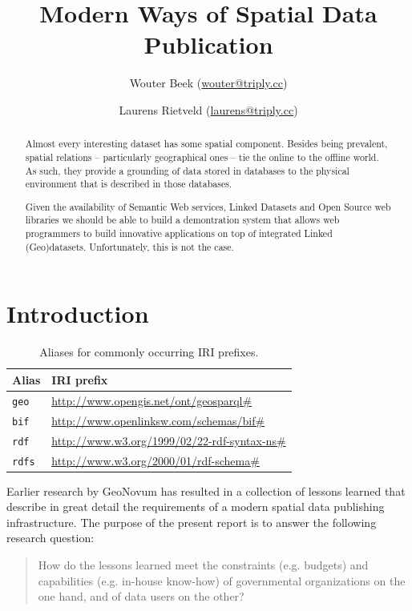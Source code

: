 \documentclass[a4paper]{scrartcl}
\title{Modern Ways of Spatial Data Publication}
\author{Wouter Beek ({\small\url{wouter@triply.cc}})}
\author{Laurens Rietveld ({\small\url{laurens@triply.cc}})}
\affil{Triply ({\small\url{http://triply.cc}})}
\date{}
\newcommand{\textt}[1]{{\small \texttt{#1}}}
\begin{document}
\maketitle

\begin{abstract}
  Almost every interesting dataset has some spatial component.
  Besides being prevalent, spatial relations -- particularly
  geographical ones -- tie the online to the offline world.  As such,
  they provide a grounding of data stored in databases to the physical
  environment that is described in those databases.

  Given the availability of Semantic Web services, Linked Datasets and
  Open Source web libraries we should be able to build a demontration
  system that allows web programmers to build innovative applications
  on top of integrated Linked (Geo)datasets.  Unfortunately, this is
  not the case.
\end{abstract}

\section{Introduction}

\begin{table}
  \begin{tabular}{|l|l|}
    \hline
    \textbf{Alias} & \textbf{IRI prefix}\\
    \hline
    \hline
    \textt{geo}    & \url{http://www.opengis.net/ont/geosparql#}\\
    \hline
    \textt{bif}    & \url{http://www.openlinksw.com/schemas/bif#}\\
    \hline
    \textt{rdf}    & \url{http://www.w3.org/1999/02/22-rdf-syntax-ns#}\\
    \hline
    \textt{rdfs}   & \url{http://www.w3.org/2000/01/rdf-schema#}\\
    \hline
  \end{tabular}
  \caption{Aliases for commonly occurring IRI prefixes.}
  \label{tab:alias}
\end{table}
  
Earlier research by GeoNovum has resulted in a collection of lessons
learned that describe in great detail the requirements of a modern
spatial data publishing infrastructure.  The purpose of the present
report is to answer the following research question:

\begin{quote}
  How do the lessons learned meet the constraints (e.g. budgets) and
  capabilities (e.g. in-house know-how) of governmental organizations
  on the one hand, and of data users on the other?
\end{quote}
\end{document}
